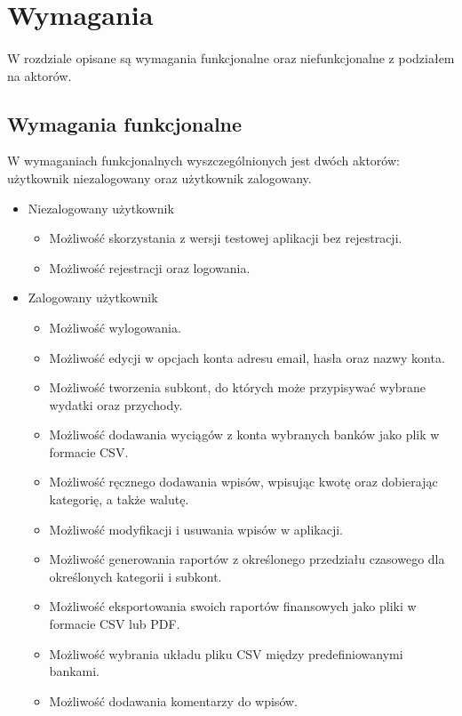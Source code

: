 \documentclass{article}
\begin{document}
\begin{itemize}


	\end{itemize}
	\section{Wymagania}
	\paragraph{} W rozdziale opisane są wymagania funkcjonalne oraz niefunkcjonalne z podziałem na aktorów.
	\subsection{Wymagania funkcjonalne}
	W wymaganiach funkcjonalnych wyszczególnionych jest dwóch aktorów: użytkownik niezalogowany oraz użytkownik zalogowany.
	\begin{itemize}
		\item Niezalogowany użytkownik
			\begin{itemize}
				\item Możliwość skorzystania z wersji testowej aplikacji bez rejestracji.
				\item Możliwość rejestracji oraz logowania.
			\end{itemize}

		\item Zalogowany użytkownik
			\begin{itemize}
				\item Możliwość wylogowania.
				\item Możliwość edycji w opcjach konta adresu email, hasła oraz nazwy konta.
				\item Możliwość tworzenia subkont, do których może przypisywać wybrane wydatki oraz przychody.
				\item Możliwość dodawania wyciągów z konta wybranych banków jako plik w formacie CSV.
				\item Możliwość ręcznego dodawania wpisów, wpisując kwotę oraz dobierając kategorię, a także walutę.
				\item Możliwość modyfikacji i usuwania wpisów w aplikacji.
				\item Możliwość generowania raportów z określonego przedziału czasowego dla określonych kategorii i subkont.
				\item Możliwość eksportowania swoich raportów finansowych jako pliki w formacie CSV lub PDF.
				\item Możliwość wybrania układu pliku CSV między predefiniowanymi bankami.
				\item Możliwość dodawania komentarzy do wpisów.
			\end{itemize}
	\end{itemize}
\end{document}
